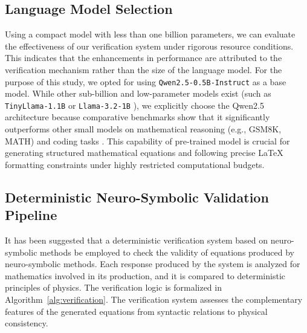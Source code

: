 \documentclass[a4paper,fleqn]{cas-sc}
\begin{document}
\subsection{Language Model Selection}
Using a compact model with less than one billion parameters, we can evaluate the effectiveness of our verification system under rigorous resource conditions. This indicates that the enhancements in performance are attributed to the verification mechanism rather than the size of the language model. For the purpose of this study, we opted for using \texttt{Qwen2.5-0.5B-Instruct} \citep{Qwen-Report} as a base model. While other sub-billion and low-parameter models exist (such as \texttt{TinyLlama-1.1B} \citep{zhang2024tiny} or \texttt{Llama-3.2-1B} \citep{dubey2024llama}), we explicitly choose the Qwen2.5 architecture because comparative benchmarks show that it significantly outperforms other small models on mathematical reasoning (e.g., GSM8K, MATH) and coding tasks \citep{Qwen-Report}. This capability of pre-trained model is crucial for generating structured mathematical equations and following precise LaTeX formatting constraints under highly restricted computational budgets.

\subsection{Deterministic Neuro-Symbolic Validation Pipeline}
It has been suggested that a deterministic verification system based on neuro-symbolic methods be employed to check the validity of equations produced by neuro-symbolic methods. Each response produced by the system is analyzed for mathematics involved in its production, and it is compared to deterministic principles of physics. The verification logic is formalized in Algorithm~\ref{alg:verification}. The verification system assesses the complementary features of the generated equations from syntactic relations to physical consistency.
\end{document}
